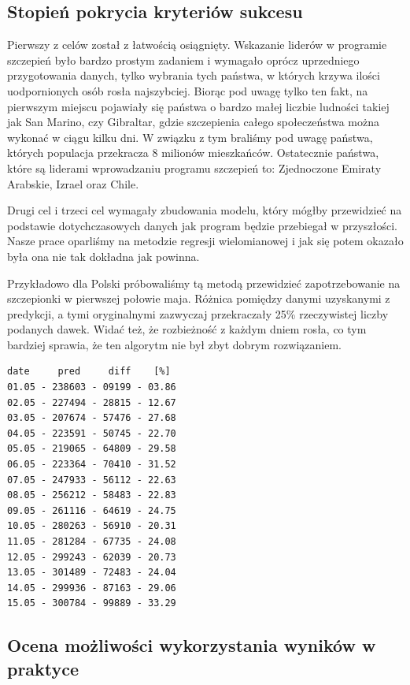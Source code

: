 \documentclass[12pt, oneside]{article}
\begin{document}
\subsection{Stopień pokrycia kryteriów sukcesu}

Pierwszy z celów został z łatwością osiągnięty. Wskazanie liderów w programie szczepień było bardzo prostym zadaniem i wymagało oprócz uprzedniego przygotowania danych, tylko wybrania tych państwa, w których krzywa ilości uodpornionych osób rosła najszybciej. Biorąc pod uwagę tylko ten fakt, na pierwszym miejscu pojawiały się państwa o bardzo małej liczbie ludności takiej jak San Marino, czy Gibraltar, gdzie szczepienia całego społeczeństwa można wykonać w ciągu kilku dni. W związku z tym braliśmy pod uwagę państwa, których populacja przekracza 8 milionów mieszkańców. Ostatecznie państwa, które są liderami  wprowadzaniu programu szczepień to: Zjednoczone Emiraty Arabskie, Izrael oraz Chile.

Drugi cel i trzeci cel wymagały zbudowania modelu, który mógłby przewidzieć na podstawie dotychczasowych danych jak program będzie przebiegał w przyszłości. Nasze prace oparliśmy na metodzie regresji wielomianowej i jak się potem okazało była ona nie tak dokładna jak powinna. 

Przykładowo dla Polski próbowaliśmy tą metodą przewidzieć zapotrzebowanie na szczepionki w pierwszej połowie maja. Różnica pomiędzy danymi uzyskanymi z predykcji, a tymi oryginalnymi zazwyczaj przekraczały 25\% rzeczywistej liczby podanych dawek. Widać też, że rozbieżność z każdym dniem rosła, co tym bardziej sprawia, że ten algorytm nie był zbyt dobrym rozwiązaniem.
 
\newpage

\begin{Verbatim}[tabsize=4]
date     pred     diff    [%]
01.05 - 238603 - 09199 - 03.86
02.05 - 227494 - 28815 - 12.67
03.05 - 207674 - 57476 - 27.68
04.05 - 223591 - 50745 - 22.70
05.05 - 219065 - 64809 - 29.58
06.05 - 223364 - 70410 - 31.52
07.05 - 247933 - 56112 - 22.63
08.05 - 256212 - 58483 - 22.83
09.05 - 261116 - 64619 - 24.75
10.05 - 280263 - 56910 - 20.31
11.05 - 281284 - 67735 - 24.08
12.05 - 299243 - 62039 - 20.73
13.05 - 301489 - 72483 - 24.04
14.05 - 299936 - 87163 - 29.06
15.05 - 300784 - 99889 - 33.29
\end{Verbatim}

\subsection{Ocena możliwości wykorzystania wyników w praktyce}
\end{document}
